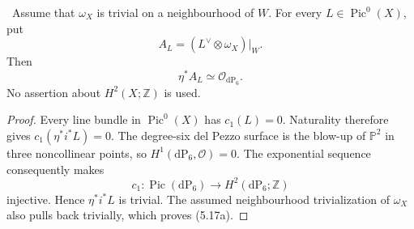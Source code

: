 \begin{proposition}
\label{prop:pic0-pullback}
\Verified\ Assume that $\omega_X$ is trivial on a neighbourhood of $W$.
For every $L\in\operatorname{Pic}^0(X)$, put
\[
 A_L=(L^\vee\otimes\omega_X)|_W.
\]
Then
\[
 \eta^*A_L\simeq\mathcal O_{\mathrm{dP}_6}.
\tag{5.17a}
\]
No assertion about $H^2(X;\mathbb Z)$ is used.
\end{proposition}

\begin{proof}
Every line bundle in $\operatorname{Pic}^0(X)$ has $c_1(L)=0$.  Naturality
therefore gives $c_1(\eta^*i^*L)=0$.  The degree-six del Pezzo surface is the
blow-up of $\mathbb P^2$ in three noncollinear points, so
$H^1(\mathrm{dP}_6,\mathcal O)=0$.  The exponential sequence consequently
makes
\[
 c_1:\operatorname{Pic}(\mathrm{dP}_6)\longrightarrow
 H^2(\mathrm{dP}_6;\mathbb Z)
\]
injective.  Hence $\eta^*i^*L$ is trivial.  The assumed neighbourhood
trivialization of $\omega_X$ also pulls back trivially, which proves
(5.17a).
\end{proof}

